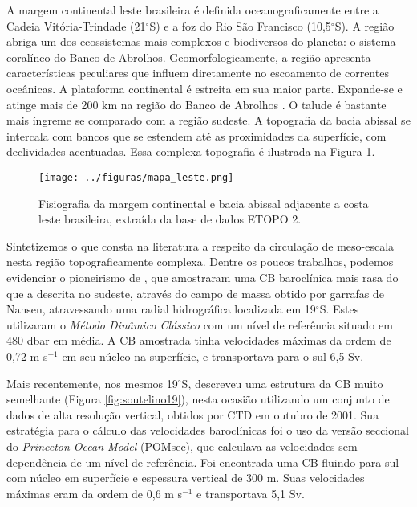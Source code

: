 \hspace{6mm} A margem continental leste brasileira é definida oceanograficamente entre a Cadeia Vitória-Trindade (21$^\circ$S)
e a foz do Rio São Francisco (10,5$^\circ$S). A região abriga um dos ecossistemas mais complexos e biodiversos
do planeta: o sistema coralíneo do Banco de Abrolhos. Geomorfologicamente, 
a região apresenta características peculiares que influem diretamente no escoamento de correntes oceânicas.
A plataforma continental é estreita em sua maior parte. Expande-se e atinge mais de 200 km
na região do Banco de Abrolhos \citep{zembruscki1979}. O talude é bastante mais íngreme se comparado
com a região sudeste. A topografia da bacia abissal se intercala 
com bancos que se estendem até as proximidades da superfície, com declividades 
acentuadas. Essa complexa topografia é ilustrada na Figura \ref{fig:batimetria}.

\begin{figure}[hb]
 \begin{center}
  \texttt{[image: ../figuras/mapa\_leste.png]}
 \end{center}
 \vspace{-.5cm}
 \renewcommand{\baselinestretch}{1}
 \caption{\label{fig:batimetria} \small Fisiografia da margem continental e bacia abissal adjacente
a costa leste brasileira, extraída da base de dados ETOPO 2.}
\end{figure}
 

Sintetizemos o que consta na literatura a respeito da circulação de meso-escala
nesta região topograficamente complexa. Dentre os poucos trabalhos, podemos
evidenciar o pioneirismo de \cite{miranda_castro1981}, que amostraram uma CB baroclínica mais rasa do que a descrita
no sudeste, através do campo de massa obtido por garrafas de Nansen, atravessando uma
radial hidrográfica localizada em 19$^\circ$S. Estes utilizaram o {\it Método Dinâmico Clássico} \citep{sandstrom_helland1903} com um 
nível de referência situado em 480 dbar em média. A CB amostrada tinha velocidades máximas da 
ordem de 0,72 m s$^{-1}$ em seu núcleo na superfície, e transportava para o sul 6,5 Sv.

Mais recentemente, nos mesmos 19$^\circ$S, \cite{soutelino2005} descreveu uma estrutura da CB muito semelhante (Figura \ref{fig:soutelino19}),
nesta ocasião utilizando um conjunto de dados de alta resolução vertical, obtidos por CTD em 
outubro de 2001. Sua estratégia para o cálculo das velocidades baroclínicas foi o uso da versão 
seccional do {\it Princeton Ocean Model} (POMsec), que calculava as velocidades sem dependência de um nível de referência. 
Foi encontrada uma CB fluindo para sul com núcleo em superfície e espessura
vertical de 300 m. Suas  velocidades máximas eram da ordem de 0,6 m s$^{-1}$ e transportava
5,1 Sv. 

